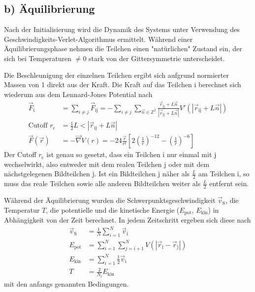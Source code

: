 \FloatBarrier
\subsection*{b) Äquilibrierung}

Nach der Initialisierung wird die Dynamik des Systems unter Verwendung des
Geschwindigkeits-Verlet-Algorithmus ermittelt.
Während einer Äquilibrierungsphase nehmen die Teilchen einen "natürlichen" Zustand ein,
der sich bei Temperaturen $\neq 0$ stark von der Gittersymmetrie unterscheidet.

Die Beschleunigung der einzelnen Teilchen ergibt sich aufgrund normierter Massen von 1
direkt aus der Kraft.
Die Kraft auf das Teilchen i berechnet sich wiederum aus dem Lennard-Jones Potential nach
\begin{align*}
    \vec{F}_\text{i}
    &= \sum_{i \neq j} \vec{F}_\text{ij}
    = - \sum_{i \neq j} \sum_{\vec{n} \in \mathbb{Z}^2}
        \frac{\vec{r}_\text{ij} + L \vec{n}}{\left|\vec{r}_\text{ij} + L \vec{n}\right|}
        V'\left(\left|\vec{r}_\text{ij} + L \vec{n}\right|\right) \\
    \text{Cutoff } r_\text{c}
    &= \frac{1}{2} L < \left|\vec{r}_\text{ij} + L \vec{n}\right| \\
    \vec{F}\!\left(\vec{r}\right)
    &= - \vec{\nabla} V\left(r\right)
    = - 24 \frac{\vec{r}}{r^2}
        \left[2 \left(\frac{1}{r}\right)^{-12} - \left(\frac{1}{r}\right)^{-6}\right]
\end{align*}
Der Cutoff $r_\text{c}$ ist genau so gesetzt, dass ein Teilchen i nur einmal mit j
wechselwirkt, also entweder mit dem realen Teilchen j oder mit dem nächstgelegenen
Bildteilchen j. Ist ein Bildteilchen j näher als $\frac{L}{2}$ am Teilchen i,
so muss das reale Teilchen sowie alle anderen Bildteilchen weiter als $\frac{L}{2}$
entfernt sein.

Während der Äquilibrierung wurden die Schwerpunktsgeschwindigkeit $\vec{v}_\text{S}$,
die Temperatur $T$, die potentielle und die kinetische Energie
($E_\text{pot}$, $E_\text{kin}$) in Abhängigkeit von der Zeit berechnet.
In jedem Zeitschritt ergeben sich diese nach
\begin{align*}
    \vec{v}_\text{S} &= \frac{1}{N} \sum_{i=1}^N \vec{v}_\text{i} \\
    E_\text{pot} &= \sum_{i=1}^N \sum_{j=i+1}^N
        V\!\left(\left|\vec{r}_\text{i} - \vec{r}_\text{j}\right|\right) \\
    E_\text{kin} &= \sum_{i=1}^N \frac{1}{2} \vec{v}_\text{i} \\
    T &= \frac{2}{N_\text{f}} E_\text{kin}
\end{align*}
mit den anfangs genannten Bedingungen.

